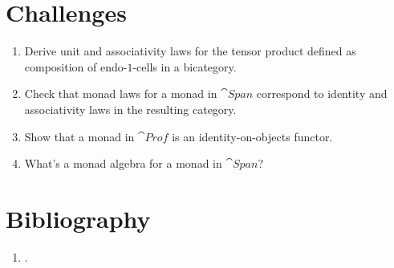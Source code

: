 \section{Challenges}

\begin{enumerate}
\tightlist
\item
  Derive unit and associativity laws for the tensor product defined as
  composition of endo-$1$-cells in a bicategory.
\item
  Check that monad laws for a monad in $\cat{Span}$ correspond to
  identity and associativity laws in the resulting category.
\item
  Show that a monad in $\cat{Prof}$ is an identity-on-objects functor.
\item
  What's a monad algebra for a monad in $\cat{Span}$?
\end{enumerate}

\section{Bibliography}
\begin{enumerate}
  \tightlist
  \item
  .
\end{enumerate}
